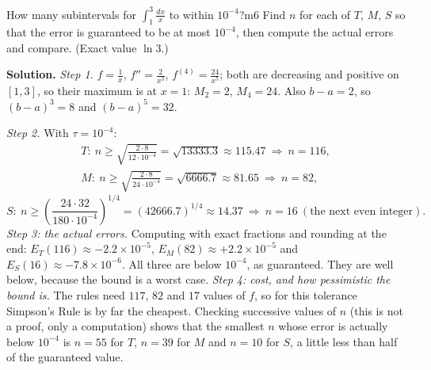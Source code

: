 \documentclass[11pt]{article}
\begin{document}
\begin{exmp}{How many subintervals for $\int_1^3\frac{dx}x$ to within $10^{-4}$?}{m6}
Find $n$ for each of $T$, $M$, $S$ so that the error is guaranteed to be at most $10^{-4}$, then compute the actual errors and compare. (Exact value $\ln3$.)

\textbf{Solution.} \emph{Step 1.} $f=\frac1x$, $f''=\frac2{x^3}$, $f^{(4)}=\frac{24}{x^5}$; both are decreasing and positive on $[1,3]$, so their maximum is at $x=1$: $M_2=2$, $M_4=24$. Also $b-a=2$, so $(b-a)^3=8$ and $(b-a)^5=32$.

\emph{Step 2.} With $\tau=10^{-4}$:
\[\begin{gathered}T:\ n\ge\sqrt{\frac{2\cdot8}{12\cdot10^{-4}}}=\sqrt{13333.3}\approx115.47\ \Rightarrow\ n=116,\\M:\ n\ge\sqrt{\frac{2\cdot8}{24\cdot10^{-4}}}=\sqrt{6666.7}\approx81.65\ \Rightarrow\ n=82,\end{gathered}\]
\[S:\ n\ge\left(\frac{24\cdot32}{180\cdot10^{-4}}\right)^{1/4}=(42666.7)^{1/4}\approx14.37\ \Rightarrow\ n=16\ (\text{the next even integer}).\]
\emph{Step 3: the actual errors.} Computing with exact fractions and rounding at the end: $E_T(116)\approx-2.2\times10^{-5}$, $E_M(82)\approx+2.2\times10^{-5}$ and $E_S(16)\approx-7.8\times10^{-6}$. All three are below $10^{-4}$, as guaranteed. They are well below, because the bound is a worst case.
\emph{Step 4: cost, and how pessimistic the bound is.} The rules need $117$, $82$ and $17$ values of $f$, so for this tolerance Simpson's Rule is by far the cheapest. Checking successive values of $n$ (this is not a proof, only a computation) shows that the smallest $n$ whose error is actually below $10^{-4}$ is $n=55$ for $T$, $n=39$ for $M$ and $n=10$ for $S$, a little less than half of the guaranteed value.

\end{exmp}
\end{document}
